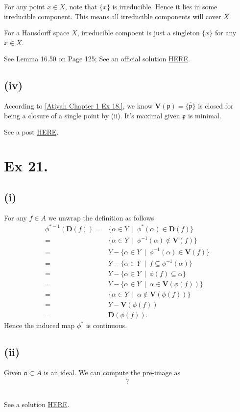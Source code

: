 For any point $x\in X$, note that $\{x\}$ is irreducible. Hence it lies in some irreducible component. This means all irreducible components will cover $X$.

For a Hausdorff space $X$, irreducible compoent is just a singleton $\{x\}$ for any $x\in X$.

See \cite{altman} Lemma 16.50 on Page 125; See an official solution \href{https://metaphor.ethz.ch/x/2019/hs/401-3660-69L/ex/SolSheet1.pdf}{HERE}.

\subsection{(iv)}

According to \ref{Atiyah Chapter 1 Ex 18.}, we know $\mathbf V(\mathfrak p)=\overline{\{\mathfrak p\}}$ is closed for being a closure of a single point by (ii). It's maximal given $\mathfrak p$ is minimal.

See a post \href{https://math.stackexchange.com/questions/764677/irreducible-components-of-speca}{HERE}.

\section{Ex 21.}\label{Atiyah Chapter 1 Ex 21.}

\subsection{(i)}

For any $f\in A$ we unwrap the definition as follows \begin{align*}
    \phi^{\ast -1}(\mathbf D(f)) =& \{\alpha\in Y ~\mid~ \phi^{\ast}(\alpha)\in \mathbf D(f)\}\\
    =& \{\alpha \in Y ~\mid~ \phi^{-1}(\alpha)\notin \mathbf V(f)\} \\
    =& Y-\{\alpha\in Y~\mid~ \phi^{-1}(\alpha)\in \mathbf V(f)\}\\
    =& Y-\{\alpha\in Y~\mid~ f\subseteq\phi^{-1}(\alpha)\}\\
    =& Y-\{\alpha\in Y~\mid~ \phi(f)\subseteq \alpha\}\\
    =& Y-\{\alpha\in Y~\mid~ \alpha\in \mathbf V(\phi(f))\}\\
    =& \{\alpha\in Y ~\mid~ \alpha\notin \mathbf V(\phi(f))\}\\
    =& Y-\mathbf V(\phi(f))\\
    =& \mathbf D(\phi(f)).
\end{align*}
Hence the induced map $\phi^{\ast}$ is continuous.

\subsection{(ii)}
Given $\mathfrak a\subset A$ is an ideal. We can compute the pre-image as \begin{align*}
    ?
\end{align*}

\subsection{}

See a solution \href{http://math_research.uct.ac.za/marques/US/AMforSophiesAGSeminar.pdf}{HERE}.